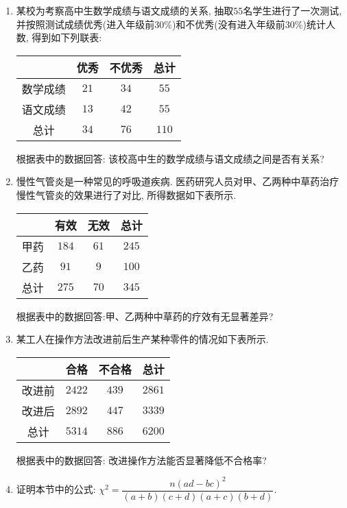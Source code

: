 \documentclass[10pt,a4paper]{article}
\begin{document}
\begin{enumerate}[1.]
\begin{center}
\begin{tabular}{|c|c|c|c|c|c|c|c|}
年份($Y$) & $2013$ & $2014$ & $2015$ & $2016$ & $2017$ & $2018$ & / \\ \hline
$N$ & $326200$ & $361100$ & $400000$ & $444000$ & $500000$ & $553900$ & / \\ \hline
$\ln N$ & $12.70$ & $12.80$ & $12.90$ & $13.00$ & $13.12$ & $13.22$ & / \\ \hline
\end{tabular}
\end{center}
(1) 完成回归模型, 并据此模型预测$2021$年我国国内的游客数量;\\
(2) 查阅$2021$年我国国内实际游客数量, 与上述模型预测数据进行比较, 并讨论数据出现偏差的原因.
\item 某校为考察高中生数学成绩与语文成绩的关系, 抽取$55$名学生进行了一次测试, 并按照测试成绩优秀(进入年级前$30\%$)和不优秀(没有进入年级前$30\%$)统计人数, 得到如下列联表:
\begin{center}
\begin{tabular}{|c|c|c|c|}
\hline
    & 优秀 & 不优秀 & 总计 \\ \hline
数学成绩 & $21$ & $34$ & $55$ \\ \hline
语文成绩 & $13$ & $42$ & $55$ \\ \hline
总计 & $34$ & $76$ & $110$ \\ \hline
\end{tabular}
\end{center}
根据表中的数据回答: 该校高中生的数学成绩与语文成绩之间是否有关系? 
\item 慢性气管炎是一种常见的呼吸道疾病. 医药研究人员对甲、乙两种中草药治疗慢性气管炎的效果进行了对比, 所得数据如下表所示.
\begin{center}
\begin{tabular}{|c|c|c|c|}
\hline
 & 有效 & 无效 & 总计 \\ \hline
甲药 & $184$ & $61$ & $245$ \\ \hline
乙药 & $91$ & $9$ & $100$ \\ \hline
总计 & $275$ & $70$ & $345$ \\ \hline
\end{tabular}
\end{center}
根据表中的数据回答:甲、乙两种中草药的疗效有无显著差异?
\item 某工人在操作方法改进前后生产某种零件的情况如下表所示.
\begin{center}
\begin{tabular}{|c|c|c|c|}
\hline
& 合格 & 不合格 & 总计 \\ \hline
改进前 & $2422$ & $439$ & $2861$ \\ \hline
改进后 & $2892$ & $447$ & $3339$ \\ \hline
总计 & $5314$ & $886$ & $6200$ \\ \hline
\end{tabular}
\end{center}
根据表中的数据回答: 改进操作方法能否显著降低不合格率?
\item 证明本节中的公式: $\chi^2=\dfrac{n(ad-bc)^2}{(a+b)(c+d)(a+c)(b+d)}$.



\end{enumerate}
\end{document}
